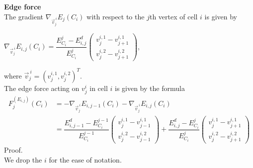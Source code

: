 \begin{proposition} \textbf{Edge force} \\
	The gradient $\nabla_{\vec{v}^{\: i}_j} E_j(C_i)$ with respect to the $j$th vertex of cell $i$ is given by 
	\begin{center}
		$\nabla_{\vec{v}^{\: i}_j} E_{i,j}(C_i) = \dfrac{E^j_{C_i} - E^d_{i,j}}{E^j_{C_i}}  \begin{pmatrix} v_{j}^{i,1} - v_{j+1}^{i,1} \\[0.5em]  v_{j}^{i,2} - v_{j+1}^{i,2} \end{pmatrix}$, 
	\end{center}
	where $\vec{v}^{\: i}_j = (v_{j}^{i,1}, v_{j}^{i,2})^T$. \\

	The edge force acting on $v_j^i$ in cell $i$ is given by the formula
	\begin{align}
		F^{(E_{i,j})}_j(C_i) &= - \nabla_{\vec{v}^{\: i}_j} E_{i,j-1}(C_i) - \nabla_{\vec{v}^{\: i}_j} E_{i,j}(C_i) \\
		&= \dfrac{E^d_{i,j-1} - E^{j-1}_{C_i}}{E^{j-1}_{C_i}}  \begin{pmatrix} v_{j}^{i,1} - v_{j-1}^{i,1} \\[0.5em]  v_{j}^{i,2} - v_{j-1}^{i,2}  \end{pmatrix}
		+ \dfrac{E^d_{i,j} - E^j_{C_i}}{E^j_{C_i}}  \begin{pmatrix} v_{j}^{i,1} - v_{j+1}^{i,1} \\[0.5em]  v_{j}^{i,2} - v_{j+1}^{i,2} 
		\end{pmatrix}
	\end{align}
	Proof. \\
	We drop the $i$ for the ease of notation. 


\end{proposition}

